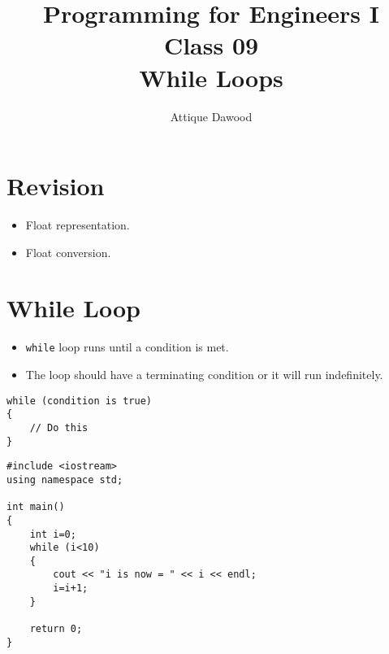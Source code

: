 \documentclass[12pt,a4paper]{article}
\title{\vspace{-2cm}Programming for Engineers I\\Class 09\\While Loops}
\author{Attique Dawood}
\begin{document}
\maketitle
\section{Revision}
\begin{itemize}
\item Float representation.
\item Float conversion.
\end{itemize}
\section{While Loop}
\begin{itemize}
\item \verb|while| loop runs until a condition is met.
\item The loop should have a terminating condition or it will run indefinitely.
\end{itemize}
\begin{lstlisting}
while (condition is true)
{
	// Do this
}
\end{lstlisting}
\begin{lstlisting}
#include <iostream>
using namespace std;

int main()
{
	int i=0;
	while (i<10)
	{
		cout << "i is now = " << i << endl;
		i=i+1;		
	}
	
	return 0;
}
\end{lstlisting}
\end{document}
